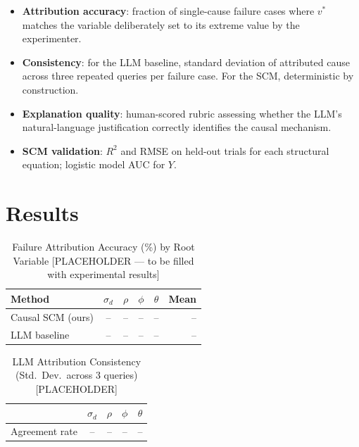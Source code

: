 \documentclass[journal]{IEEEtran}
\begin{document}
\begin{itemize}
  \item \textbf{Attribution accuracy}: fraction of single-cause
        failure cases where $v^*$ matches the variable deliberately
        set to its extreme value by the experimenter.
  \item \textbf{Consistency}: for the LLM baseline, standard
        deviation of attributed cause across three repeated queries
        per failure case.  For the SCM, deterministic by construction.
  \item \textbf{Explanation quality}: human-scored rubric assessing
        whether the LLM's natural-language justification correctly
        identifies the causal mechanism.
  \item \textbf{SCM validation}: $R^2$ and RMSE on held-out trials
        for each structural equation; logistic model AUC for $Y$.
\end{itemize}

\section{Results}
\label{sec:results}

\begin{table}[t]
  \caption{Failure Attribution Accuracy (\%) by Root Variable
           [PLACEHOLDER --- to be filled with experimental results]}
  \label{tab:attribution}
  \centering
  \begin{tabular}{lccccr}
    \toprule
    \textbf{Method}
      & $\sigma_d$ & $\rho$ & $\phi$ & $\theta$ & \textbf{Mean} \\
    \midrule
    Causal SCM (ours) & -- & -- & -- & -- & -- \\
    LLM baseline      & -- & -- & -- & -- & -- \\
    \bottomrule
  \end{tabular}
\end{table}

\begin{table}[t]
  \caption{LLM Attribution Consistency (Std.\ Dev.\ across 3 queries)
           [PLACEHOLDER]}
  \label{tab:consistency}
  \centering
  \begin{tabular}{lcccc}
    \toprule
    & $\sigma_d$ & $\rho$ & $\phi$ & $\theta$ \\
    \midrule
    Agreement rate & -- & -- & -- & -- \\
    \bottomrule
  \end{tabular}
\end{table}
\end{document}
